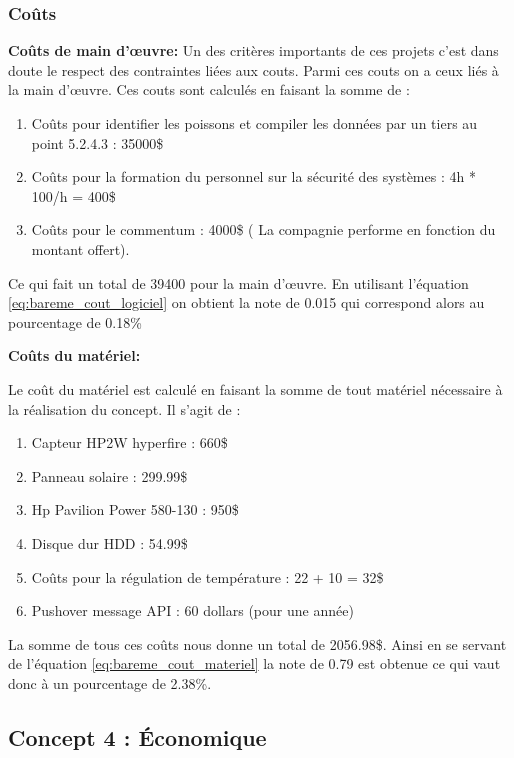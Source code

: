 \subsubsection{Coûts}


\textbf{Coûts de main d’œuvre:} Un des critères importants de ces projets c’est dans doute le respect des contraintes liées aux couts. Parmi ces couts on a ceux liés à la main d’œuvre. Ces couts sont calculés en faisant la somme de : 
\begin{enumerate}
    \item Coûts pour identifier les poissons et compiler les données par un tiers au point 5.2.4.3 : 35000\$
    \item Coûts pour la formation du personnel sur la sécurité des systèmes : 4h * 100/h = 400\$
    \item Coûts pour le commentum : 4000\$ ( La compagnie performe en fonction du montant offert).
\end{enumerate}

Ce qui fait un total de 39400 pour la main d’œuvre. En utilisant l’équation \ref{eq:bareme_cout_logiciel} on obtient la note de 0.015 qui correspond alors au pourcentage de 0.18\%
\vspace{5mm}

\textbf{Coûts du matériel:}

Le coût du matériel est calculé en faisant la somme de tout matériel nécessaire à la réalisation du concept. Il s’agit de :
\begin{enumerate}
    \item Capteur HP2W hyperfire : 660\$
    \item Panneau solaire : 299.99\$
    \item Hp Pavilion Power 580-130 : 950\$
    \item Disque dur HDD : 54.99\$
    \item Coûts pour la régulation de température : 22 + 10 = 32\$
    \item Pushover message API : 60 dollars (pour une année)
\end{enumerate}

La somme de tous ces coûts nous donne un total de 2056.98\$. Ainsi en se servant de l’équation \ref{eq:bareme_cout_materiel} la note de 0.79 est obtenue ce qui vaut donc à un pourcentage de 2.38\%.


\subsection{Concept 4 : Économique}

